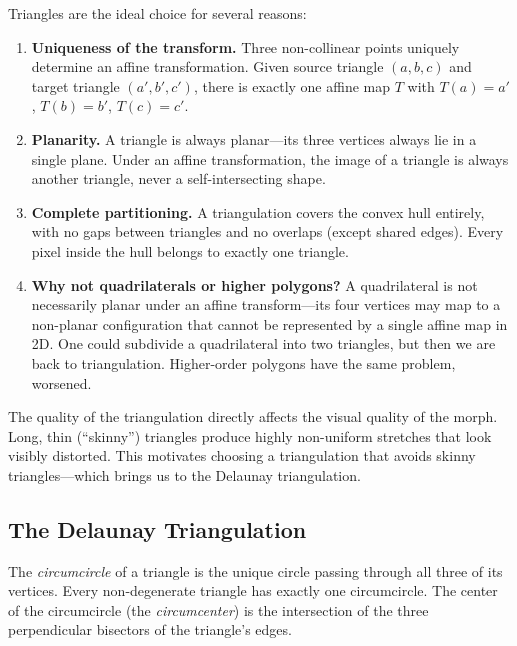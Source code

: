 Triangles are the ideal choice for several reasons:
\begin{enumerate}
    \item \textbf{Uniqueness of the transform.} Three non-collinear points
    uniquely determine an affine transformation.  Given source triangle
    $(a, b, c)$ and target triangle $(a', b', c')$, there is exactly one
    affine map $T$ with $T(a)=a'$, $T(b)=b'$, $T(c)=c'$.
    \item \textbf{Planarity.} A triangle is always planar---its three vertices
    always lie in a single plane.  Under an affine transformation, the image of
    a triangle is always another triangle, never a self-intersecting shape.
    \item \textbf{Complete partitioning.} A triangulation covers the convex hull
    entirely, with no gaps between triangles and no overlaps (except shared
    edges).  Every pixel inside the hull belongs to exactly one triangle.
    \item \textbf{Why not quadrilaterals or higher polygons?} A quadrilateral
    is not necessarily planar under an affine transform---its four vertices may
    map to a non-planar configuration that cannot be represented by a single
    affine map in 2D.  One could subdivide a quadrilateral into two triangles,
    but then we are back to triangulation.  Higher-order polygons have the same
    problem, worsened.
\end{enumerate}

The quality of the triangulation directly affects the visual quality of the
morph.  Long, thin (``skinny'') triangles produce highly non-uniform stretches
that look visibly distorted.  This motivates choosing a triangulation that
avoids skinny triangles---which brings us to the Delaunay triangulation.

\subsection{The Delaunay Triangulation}

\begin{definition}[Circumcircle]
    The \emph{circumcircle} of a triangle is the unique circle passing through
    all three of its vertices.  Every non-degenerate triangle has exactly one
    circumcircle.  The center of the circumcircle (the \emph{circumcenter}) is
    the intersection of the three perpendicular bisectors of the triangle's edges.
\end{definition}

